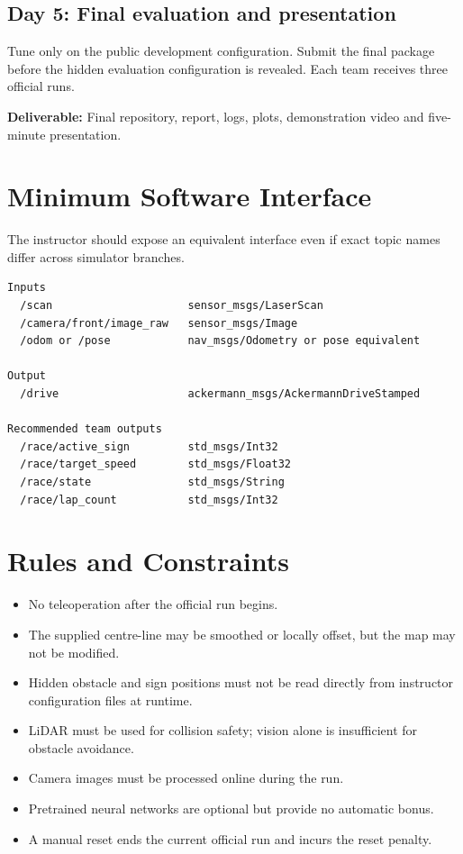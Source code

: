 \documentclass[11pt,a4paper]{article}
\newcommand{\deliverable}[1]{\textbf{Deliverable:} #1}
\begin{document}
\subsection*{Day 5: Final evaluation and presentation}
Tune only on the public development configuration. Submit the final package before the hidden evaluation configuration is revealed. Each team receives three official runs.

\deliverable{Final repository, report, logs, plots, demonstration video and five-minute presentation.}

\section{Minimum Software Interface}
The instructor should expose an equivalent interface even if exact topic names differ across simulator branches.

\begin{lstlisting}
Inputs
  /scan                     sensor_msgs/LaserScan
  /camera/front/image_raw   sensor_msgs/Image
  /odom or /pose            nav_msgs/Odometry or pose equivalent

Output
  /drive                    ackermann_msgs/AckermannDriveStamped

Recommended team outputs
  /race/active_sign         std_msgs/Int32
  /race/target_speed        std_msgs/Float32
  /race/state               std_msgs/String
  /race/lap_count           std_msgs/Int32
\end{lstlisting}

\section{Rules and Constraints}
\begin{itemize}
  \item No teleoperation after the official run begins.
  \item The supplied centre-line may be smoothed or locally offset, but the map may not be modified.
  \item Hidden obstacle and sign positions must not be read directly from instructor configuration files at runtime.
  \item LiDAR must be used for collision safety; vision alone is insufficient for obstacle avoidance.
  \item Camera images must be processed online during the run.
  \item Pretrained neural networks are optional but provide no automatic bonus.
  \item A manual reset ends the current official run and incurs the reset penalty.
\end{itemize}
\end{document}
